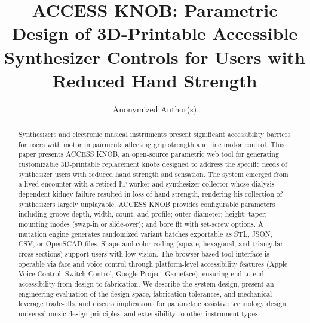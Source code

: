 \documentclass[manuscript,screen,review,anonymous]{acmart}
\begin{document}
\title{ACCESS KNOB: Parametric Design of 3D-Printable Accessible Synthesizer Controls for Users with Reduced Hand Strength}

\author{Anonymized Author(s)}

%
%

\begin{abstract}
Synthesizers and electronic musical instruments present significant accessibility barriers for users with motor impairments affecting grip strength and fine motor control. This paper presents ACCESS KNOB, an open-source parametric web tool for generating customizable 3D-printable replacement knobs designed to address the specific needs of synthesizer users with reduced hand strength and sensation. The system emerged from a lived encounter with a retired IT worker and synthesizer collector whose dialysis-dependent kidney failure resulted in loss of hand strength, rendering his collection of synthesizers largely unplayable. ACCESS KNOB provides configurable parameters including groove depth, width, count, and profile; outer diameter; height; taper; mounting modes (swap-in or slide-over); and bore fit with set-screw options. A mutation engine generates randomized variant batches exportable as STL, JSON, CSV, or OpenSCAD files. Shape and color coding (square, hexagonal, and triangular cross-sections) support users with low vision. The browser-based tool interface is operable via face and voice control through platform-level accessibility features (Apple Voice Control, Switch Control, Google Project Gameface), ensuring end-to-end accessibility from design to fabrication. We describe the system design, present an engineering evaluation of the design space, fabrication tolerances, and mechanical leverage trade-offs, and discuss implications for parametric assistive technology design, universal music design principles, and extensibility to other instrument types.
\end{abstract}
\end{document}
